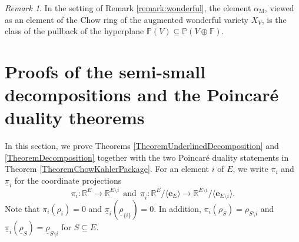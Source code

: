 \documentclass[11pt,reqno]{amsart}
\theoremstyle{definition}
\theoremstyle{remark}
\newtheorem{remark}[theorem]{Remark}
\renewcommand{\(}{\left(}
\renewcommand{\)}{\right)}
\newcommand{\<}{\left<}
\renewcommand{\>}{\right>}
\begin{document}
\begin{remark}
In the setting of Remark \ref{remark:wonderful},
the element $\alpha_\mathrm{M}$, viewed as an element of the Chow ring of the augmented wonderful variety $X_V$,
is the class of the pullback  of the hyperplane  $\mathbb{P}(V) \subseteq \mathbb{P}(V \oplus \mathbb{F})$.
\end{remark}

\section{Proofs of the semi-small decompositions and the Poincar\'e duality theorems}\label{Section3}

In this section, we prove Theorems \ref{TheoremUnderlinedDecomposition} and \ref{TheoremDecomposition} together with the two Poincar\'e duality statements in Theorem \ref{TheoremChowKahlerPackage}.
For an element $i$ of $E$, we write  $\pi_i$ and $\underline{\pi}_i$ for the coordinate projections
\[
\pi_i: \mathbb{R}^E \longrightarrow \mathbb{R}^{E \setminus i} \ \ \text{and} \ \ 
\underline{\pi}_i: \mathbb{R}^E / \langle \mathbf{e}_E \rangle\longrightarrow \mathbb{R}^{E \setminus i}/\langle \mathbf{e}_{E\setminus i} \rangle.
\]
Note that $\pi_i(\rho_i)=0$ and $\underline{\pi}_i(\underline{\rho}_{\{i\}})=0$.
In addition, $\pi_i(\rho_S)=\rho_{S \setminus i}$
and $\underline{\pi}_i(\underline{\rho}_S)=\underline{\rho}_{S \setminus i}$ for $S \subseteq E$.
\end{document}
